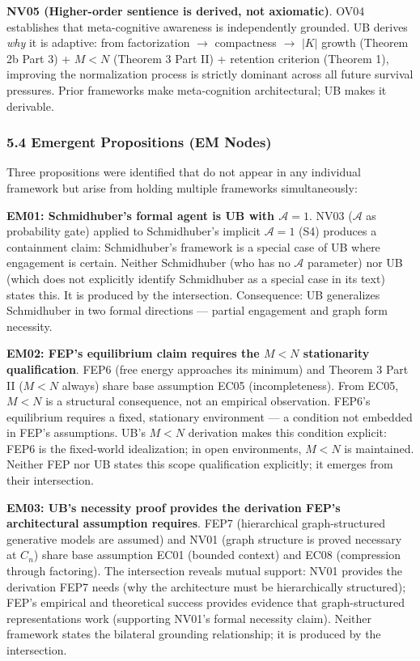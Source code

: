 \documentclass[
]{article}
\begin{document}
\textbf{NV05 (Higher-order sentience is derived, not axiomatic)}. OV04
establishes that meta-cognitive awareness is independently grounded. UB
derives \emph{why} it is adaptive: from factorization \(\to\)
compactness \(\to\) \(|K|\) growth (Theorem 2b Part 3) + \(M < N\)
(Theorem 3 Part II) + retention criterion (Theorem 1), improving the
normalization process is strictly dominant across all future survival
pressures. Prior frameworks make meta-cognition architectural; UB makes
it derivable.

\subsubsection{5.4 Emergent Propositions (EM
Nodes)}\label{emergent-propositions-em-nodes}

Three propositions were identified that do not appear in any individual
framework but arise from holding multiple frameworks simultaneously:

\textbf{EM01: Schmidhuber's formal agent is UB with
\(\mathcal{A} = 1\)}. NV03 (\(\mathcal{A}\) as probability gate) applied
to Schmidhuber's implicit \(\mathcal{A} = 1\) (S4) produces a
containment claim: Schmidhuber's framework is a special case of UB where
engagement is certain. Neither Schmidhuber (who has no \(\mathcal{A}\)
parameter) nor UB (which does not explicitly identify Schmidhuber as a
special case in its text) states this. It is produced by the
intersection. Consequence: UB generalizes Schmidhuber in two formal
directions --- partial engagement and graph form necessity.

\textbf{EM02: FEP's equilibrium claim requires the \(M < N\)
stationarity qualification}. FEP6 (free energy approaches its minimum)
and Theorem 3 Part II (\(M < N\) always) share base assumption EC05
(incompleteness). From EC05, \(M < N\) is a structural consequence, not
an empirical observation. FEP6's equilibrium requires a fixed,
stationary environment --- a condition not embedded in FEP's
assumptions. UB's \(M < N\) derivation makes this condition explicit:
FEP6 is the fixed-world idealization; in open environments, \(M < N\) is
maintained. Neither FEP nor UB states this scope qualification
explicitly; it emerges from their intersection.

\textbf{EM03: UB's necessity proof provides the derivation FEP's
architectural assumption requires}. FEP7 (hierarchical graph-structured
generative models are assumed) and NV01 (graph structure is proved
necessary at \(C_n\)) share base assumption EC01 (bounded context) and
EC08 (compression through factoring). The intersection reveals mutual
support: NV01 provides the derivation FEP7 needs (why the architecture
must be hierarchically structured); FEP's empirical and theoretical
success provides evidence that graph-structured representations work
(supporting NV01's formal necessity claim). Neither framework states the
bilateral grounding relationship; it is produced by the intersection.
\end{document}
